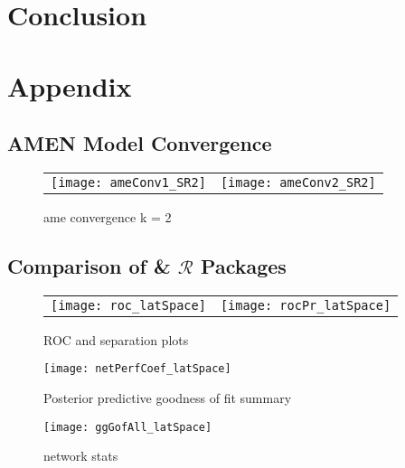 \section{\textbf{Conclusion}}



\newpage
\section{\textbf{Appendix}}

\subsection{AMEN Model Convergence}

\begin{figure}[ht]
	\centering
	\begin{tabular}{cc}
	\texttt{[image: ameConv1\_SR2]} &
	\texttt{[image: ameConv2\_SR2]}
	\end{tabular}
	\caption{ame convergence k = 2}
	\label{fig:ameConv}
\end{figure}
\FloatBarrier
\newpage

\subsection{Comparison of  \&  $\mathcal{R}$ Packages}



% 

\begin{figure}[ht]
	\centering
	\begin{tabular}{cc}
	\texttt{[image: roc\_latSpace]} & 
	\texttt{[image: rocPr\_latSpace]}
	\end{tabular}
	\caption{ROC and separation plots}
	\label{fig:roc_latentSpace}
\end{figure}

\begin{figure}[ht]
	\centering
	\texttt{[image: netPerfCoef\_latSpace]}
	\caption{Posterior predictive goodness of fit summary}
	\label{fig:netPerfCoef_latSpace}
\end{figure}

\begin{figure}[ht]
	\centering
	\texttt{[image: ggGofAll\_latSpace]}
	\caption{network stats }
	\label{fig:gofAll_latSpace}
\end{figure}
\FloatBarrier
\newpage

